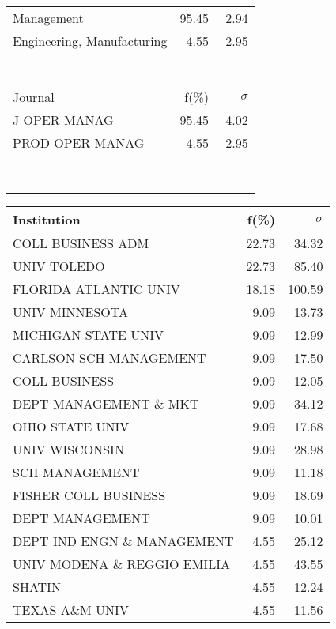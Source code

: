 \documentclass[a4paper,11pt]{report}
\begin{document}
\begin{landscape}
\begin{table}[!ht]
{\begin{tabular}{|l r  r|}
Management & 95.45 & 2.94\\
Engineering, Manufacturing & 4.55 & -2.95\\
 &  & \\
 &  & \\
 &  & \\
 &  & \\
 &  & \\
 &  & \\
 &  & \\
\hline
\hline
Journal & f(\%) & $\sigma$\\
\hline
J OPER MANAG & 95.45 & 4.02\\
PROD OPER MANAG & 4.55 & -2.95\\
 &  & \\
 &  & \\
 &  & \\
 &  & \\
 &  & \\
 &  & \\
 &  & \\
 &  & \\
\hline
\end{tabular}
}
{\scriptsize\begin{tabular}{|l r r|}
\hline
Institution & f(\%) & $\sigma$\\
\hline
COLL BUSINESS ADM & 22.73 & 34.32\\
UNIV TOLEDO & 22.73 & 85.40\\
FLORIDA ATLANTIC UNIV & 18.18 & 100.59\\
UNIV MINNESOTA & 9.09 & 13.73\\
MICHIGAN STATE UNIV & 9.09 & 12.99\\
CARLSON SCH MANAGEMENT & 9.09 & 17.50\\
COLL BUSINESS & 9.09 & 12.05\\
DEPT MANAGEMENT \& MKT & 9.09 & 34.12\\
OHIO STATE UNIV & 9.09 & 17.68\\
UNIV WISCONSIN & 9.09 & 28.98\\
SCH MANAGEMENT & 9.09 & 11.18\\
FISHER COLL BUSINESS & 9.09 & 18.69\\
DEPT MANAGEMENT & 9.09 & 10.01\\
DEPT IND ENGN \& MANAGEMENT & 4.55 & 25.12\\
UNIV MODENA \& REGGIO EMILIA & 4.55 & 43.55\\
SHATIN & 4.55 & 12.24\\
TEXAS A\&M UNIV & 4.55 & 11.56\\

\end{tabular}}
\end{table}
\end{landscape}
\end{document}

